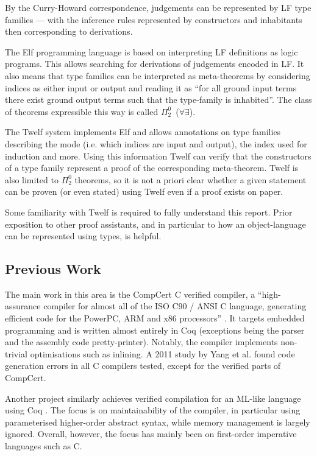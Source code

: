 By the Curry-Howard correspondence, judgements can be represented by LF type families --- with the inference rules represented by constructors and inhabitants then corresponding to derivations.

The Elf programming language is based on interpreting LF definitions as logic programs.
This allows searching for derivations of judgements encoded in LF.
It also means that type families can be interpreted as meta-theorems by considering indices as either input or output and reading it as ``for all ground input terms there exist ground output terms such that the type-family is inhabited''.
The class of theorems expressible this way is called $\Pi_2^0$~($\forall \exists$).

The Twelf system implements Elf and allows annotations on type families describing the mode (i.e. which indices are input and output), the index used for induction and more.
Using this information Twelf can verify that the constructors of a type family represent a proof of the corresponding meta-theorem.
Twelf is also limited to $\Pi_2^0$ theorems, so it is not a priori clear whether a given statement can be proven (or even stated) using Twelf even if a proof exists on paper.

Some familiarity with Twelf is required to fully understand this report.
Prior exposition to other proof assistants, and in particular to how an object-language can be represented using types, is helpful.


\subsection{Previous Work}

The main work in this area is the CompCert C verified compiler, a ``high-assurance compiler for almost all of the ISO C90 / ANSI C language, generating efficient code for the PowerPC, ARM and x86 processors'' \cite{CompCert16}.
It targets embedded programming and is written almost entirely in Coq (exceptions being the parser and the assembly code pretty-printer).
Notably, the compiler implements non-trivial optimisations such as inlining.
A 2011 study by Yang et al. \cite{Yang11} found code generation errors in all C compilers tested, except for the verified parts of CompCert.

Another project similarly achieves verified compilation for an ML-like language using Coq \cite{Chlipala10}.
The focus is on maintainability of the compiler, in particular using parameterised higher-order abstract syntax, while memory management is largely ignored.
Overall, however, the focus has mainly been on first-order imperative languages such as C.

